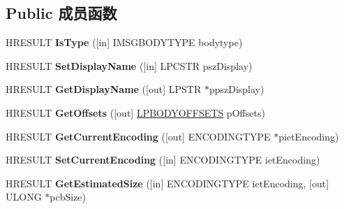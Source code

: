 \subsection*{Public 成员函数}
\begin{DoxyCompactItemize}
\item 
\mbox{\label{interface_m_i_m_e_o_l_e_1_1_i_mime_body_a82e04d52295f8699f8fdf8fae860d8ac}} 
H\+R\+E\+S\+U\+LT {\bfseries Is\+Type} (\mbox{[}in\mbox{]} I\+M\+S\+G\+B\+O\+D\+Y\+T\+Y\+PE bodytype)
\item 
\mbox{\label{interface_m_i_m_e_o_l_e_1_1_i_mime_body_a2e961bf95ac1cae6fd8be05a1445ad75}} 
H\+R\+E\+S\+U\+LT {\bfseries Set\+Display\+Name} (\mbox{[}in\mbox{]} L\+P\+C\+S\+TR psz\+Display)
\item 
\mbox{\label{interface_m_i_m_e_o_l_e_1_1_i_mime_body_aa2dfc7eed1aba69f01552ab93858e3d2}} 
H\+R\+E\+S\+U\+LT {\bfseries Get\+Display\+Name} (\mbox{[}out\mbox{]} L\+P\+S\+TR $\ast$ppsz\+Display)
\item 
\mbox{\label{interface_m_i_m_e_o_l_e_1_1_i_mime_body_abfa79eb9c965fbcbbd85bd3a1a17357a}} 
H\+R\+E\+S\+U\+LT {\bfseries Get\+Offsets} (\mbox{[}out\mbox{]} \hyperlink{struct_m_i_m_e_o_l_e_1_1_i_mime_body_1_1tag_b_o_d_y_o_f_f_s_e_t_s}{L\+P\+B\+O\+D\+Y\+O\+F\+F\+S\+E\+TS} p\+Offsets)
\item 
\mbox{\label{interface_m_i_m_e_o_l_e_1_1_i_mime_body_a35dae790602251a269c0805b4a75f887}} 
H\+R\+E\+S\+U\+LT {\bfseries Get\+Current\+Encoding} (\mbox{[}out\mbox{]} E\+N\+C\+O\+D\+I\+N\+G\+T\+Y\+PE $\ast$piet\+Encoding)
\item 
\mbox{\label{interface_m_i_m_e_o_l_e_1_1_i_mime_body_a9038cc60344e635aceace7b640388a54}} 
H\+R\+E\+S\+U\+LT {\bfseries Set\+Current\+Encoding} (\mbox{[}in\mbox{]} E\+N\+C\+O\+D\+I\+N\+G\+T\+Y\+PE iet\+Encoding)
\item 
\mbox{\label{interface_m_i_m_e_o_l_e_1_1_i_mime_body_add6bdfec052b3affbb6fc182f31fff30}} 
H\+R\+E\+S\+U\+LT {\bfseries Get\+Estimated\+Size} (\mbox{[}in\mbox{]} E\+N\+C\+O\+D\+I\+N\+G\+T\+Y\+PE iet\+Encoding, \mbox{[}out\mbox{]} U\+L\+O\+NG $\ast$pcb\+Size)

\end{DoxyCompactItemize}
